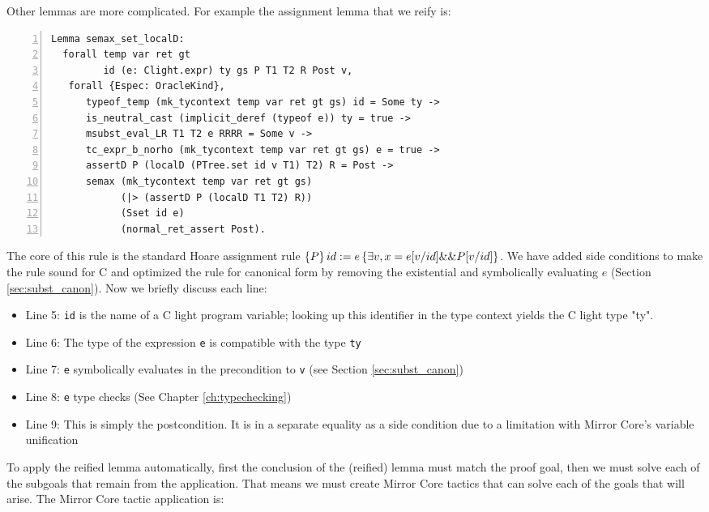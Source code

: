 \documentclass{puthesis}
\begin{document}
 Other lemmas are more
complicated. For example the assignment lemma that we reify is:

\begin{lstlisting}[numbers=left]
Lemma semax_set_localD:
  forall temp var ret gt 
         id (e: Clight.expr) ty gs P T1 T2 R Post v,
   forall {Espec: OracleKind},
      typeof_temp (mk_tycontext temp var ret gt gs) id = Some ty -> 
      is_neutral_cast (implicit_deref (typeof e)) ty = true ->
      msubst_eval_LR T1 T2 e RRRR = Some v ->
      tc_expr_b_norho (mk_tycontext temp var ret gt gs) e = true ->
      assertD P (localD (PTree.set id v T1) T2) R = Post ->
      semax (mk_tycontext temp var ret gt gs) 
            (|> (assertD P (localD T1 T2) R))
            (Sset id e)
            (normal_ret_assert Post).
\end{lstlisting}

The core of this rule is the standard Hoare assignment rule
$\{P\}\,id:=e\,\{\exists v, x=e[v/id] \&\& P[v/id]\}$. We have added side
conditions to make the rule sound for C and optimized the rule for
canonical form by removing the existential and symbolically evaluating
$e$ (Section \ref{sec:subst_canon}). Now we briefly discuss each line:

\begin{itemize}
\item Line 5: \lstinline|id| is the name of a C light program
  variable; looking up this identifier in the type context yields the C light type "ty".
\item Line 6: The type of the expression \lstinline|e| is compatible
  with the type \lstinline|ty|
\item Line 7: \lstinline|e| symbolically evaluates in the precondition
  to \lstinline|v| (see Section \ref{sec:subst_canon})
\item Line 8: \lstinline|e| type checks (See Chapter
  \ref{ch:typechecking})
\item Line 9: This is simply the postcondition. It is in a separate
  equality as a side condition due to a limitation with Mirror Core's
  variable unification
\end{itemize}

To apply the reified lemma automatically, first the conclusion of the
(reified) lemma must match the proof goal, then we must solve each of
the subgoals that remain from the application. That means we must
create Mirror Core tactics that can solve each of the goals that will
arise. The Mirror Core tactic application is:
\end{document}
